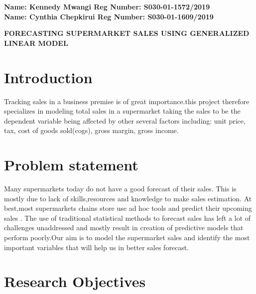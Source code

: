 \documentclass[twoside,a4paper,12pt]{article}
\begin{document}
	
	\begin{center} 
			\large{\bf{Name: Kennedy Mwangi       Reg Number: S030-01-1572/2019\\
					   Name: Cynthia Chepkirui    Reg Number: S030-01-1609/2019\\}} \vspace*{0.5in}
	\end{center}
	
	\begin{center} \Large{ \bf{FORECASTING SUPERMARKET SALES USING GENERALIZED LINEAR MODEL}} \end{center}	


\section*{Introduction} Tracking sales in a business premise is of great importance.this project therefore specializes in modeling total sales in a supermarket taking the sales to be the dependent variable being affected by other several factors including: unit price, tax, cost of goods sold(cogs), gross margin, gross income.



\section*{Problem statement}

Many supermarkets today do not have a good forecast of their sales. This is mostly due to lack of skills,resources and knowledge to make sales estimation. At best,most supermarkets chains store use ad hoc tools and predict their upcoming sales .
The use of traditional statistical methods to forecast sales has left a lot of challenges unaddressed and mostly result in creation of predictive models that perform poorly.Our aim is to model the supermarket sales and  identify the most important variables that will  help us in better sales forecast.

\section*{Research Objectives} 
\end{document}
